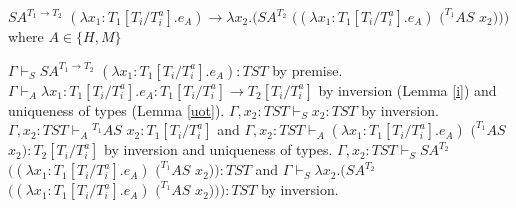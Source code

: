 \begin{case}
$SA^{T_{1}\rightarrow T_{2}}$ $(\lambda x_{1}:T_{1}[T_{i}/T_{i}^{a}].e_{A})\rightarrow\lambda x_{2}.(SA^{T_{2}}$ $((\lambda x_{1}:T_{1}[T_{i}/T_{i}^{a}].e_{A})$ $(^{T_{1}}AS$ $x_{2})))$ where $A\in\lbrace H,M\rbrace$

$\Gamma\vdash_{S}SA^{T_{1}\rightarrow T_{2}}$ $(\lambda x_{1}:T_{1}[T_{i}/T_{i}^{a}].e_{A}):TST$ by premise.  $\Gamma\vdash_{A}\lambda x_{1}:T_{1}[T_{i}/T_{i}^{a}].e_{A}:T_{1}[T_{i}/T_{i}^{a}]\rightarrow T_{2}[T_{i}/T_{i}^{a}]$ by inversion (Lemma \ref{i}) and uniqueness of types (Lemma \ref{uot}).  $\Gamma,x_{2}:TST\vdash_{S}x_{2}:TST$ by inversion.  $\Gamma,x_{2}:TST\vdash_{A}{^{T_{1}}A}S$ $x_{2}:T_{1}[T_{i}/T_{i}^{a}]$ and $\Gamma,x_{2}:TST\vdash_{A}(\lambda x_{1}:T_{1}[T_{i}/T_{i}^{a}].e_{A})$ $(^{T_{1}}AS$ $x_{2}):T_{2}[T_{i}/T_{i}^{a}]$ by inversion and uniqueness of types.  $\Gamma,x_{2}:TST\vdash_{S}SA^{T_{2}}$ $((\lambda x_{1}:T_{1}[T_{i}/T_{i}^{a}].e_{A})$ $(^{T_{1}}AS$ $x_{2})):TST$ and $\Gamma\vdash_{S}\lambda x_{2}.(SA^{T_{2}}$ $((\lambda x_{1}:T_{1}[T_{i}/T_{i}^{a}].e_{A})$ $(^{T_{1}}AS$ $x_{2}))):TST$ by inversion.
\end{case}